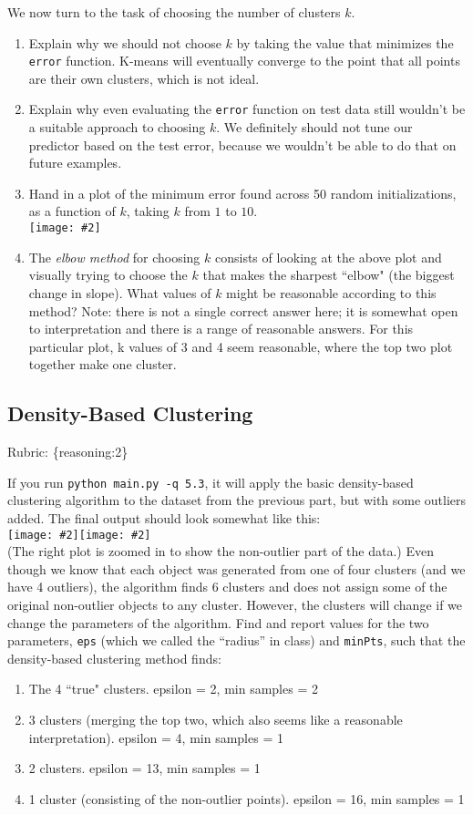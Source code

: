 \documentclass{article}
\def\rubric#1{\gre{Rubric: \{#1\}}}{}
\def\blu#1{{\color{blu}#1}}
\def\gre#1{{\color{gre}#1}}
\def\red#1{{\color{red}#1}}
\newcommand{\fig}[2]{\texttt{[image: \#2]}}
\def\enum#1{\begin{enumerate}#1\end{enumerate}}
\begin{document}
 We now turn to the task of choosing the number of clusters $k$.

 \blu{\enum{
 \item Explain why we should not choose $k$ by taking the value that minimizes the \texttt{error} function. \red{K-means will eventually converge to the point that all points are their own clusters, which is not ideal.}
 \item Explain why even evaluating the \texttt{error} function on test data still wouldn't be a suitable approach to choosing $k$. \red{We definitely should not tune our predictor based on the test error, because we wouldn’t be able to do that
on future examples.}
 \item Hand in a plot of the minimum error found across 50 random initializations, as a function of $k$, taking $k$ from $1$ to $10$.\\ \fig{.49}{./figs/kmeans_500_runs.png}
 \item The \emph{elbow method} for choosing $k$ consists of looking at the above plot and visually trying to choose the $k$ that makes the sharpest ``elbow" (the biggest change in slope). What values of $k$ might be reasonable according to this method? Note: there is not a single correct answer here; it is somewhat open to interpretation and there is a range of reasonable answers. \red{For this particular plot, k values of 3 and 4 seem reasonable, where the top two plot together make one cluster.}
 }}

\subsection{Density-Based Clustering}
\rubric{reasoning:2}

If you run \texttt{python main.py -q 5.3},
it will apply the basic density-based clustering algorithm to the dataset from the previous part, but with some outliers added.
The final output should look somewhat like this:\\
\fig{.49}{./figs/density}\fig{.49}{./figs/density2}\\
(The right plot is zoomed in to show the non-outlier part of the data.)
Even though we know that each object was generated from one of four clusters (and we have 4 outliers),
 the algorithm finds 6 clusters and does not assign some of the original non-outlier
  objects to any cluster. However, the clusters will change if we change the parameters
  of the algorithm. Find and report values for the two
  parameters, \texttt{eps} (which we called the ``radius'' in class) and \texttt{minPts},
   such that the density-based clustering method finds:
\blu{\enum{
\item The 4 ``true" clusters. \red{epsilon = 2, min samples = 2}
\item 3 clusters (merging the top two, which also seems like a reasonable interpretation). \red{epsilon = 4, min samples = 1}
\item 2 clusters. \red{epsilon = 13, min samples = 1}
\item 1 cluster (consisting of the non-outlier points). \red{epsilon = 16, min samples = 1}
}
}
\end{document}
